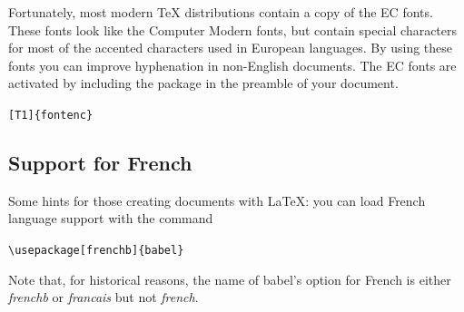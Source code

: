 \documentclass[twoside,letterpaper,11pt]{article}
\begin{document}
Fortunately, most modern \TeX{} distributions contain a copy of the EC
fonts. These fonts look like the Computer Modern fonts, but contain
special characters for most of the accented characters used in
European languages. By using these fonts you can improve hyphenation
in non-English documents. The EC fonts are activated by including the
 package in the preamble of your document. \label{fontenc}

\begin{lscommand}
\verb|[T1]{fontenc}| 
\end{lscommand}

\subsection{Support for French}

Some hints for those creating  documents with \LaTeX{}:
you can load French language support with the command

\begin{lscommand}
\verb|\usepackage[frenchb]{babel}|
\end{lscommand}

Note that, for historical reasons, the name of \textsf{babel}'s option 
for French is either \emph{frenchb} or \emph{francais} but not \emph{french}.
\end{document}
